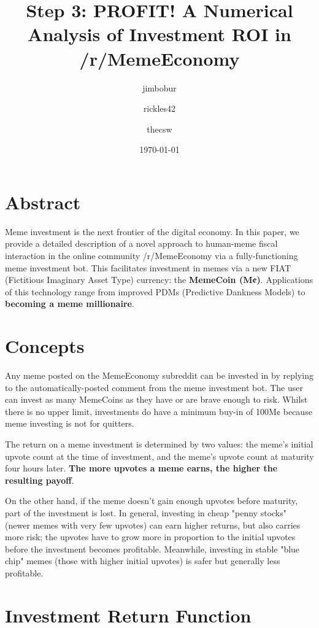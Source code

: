 \documentclass[a4paper, 12pt]{article}
\author[1]{jimbobur}\author[2]{rickles42}\author[2]{thecsw}
\affil[1]{University of Memechester}\affil[2]{Memeachusetts Institute of Dankology}
\date{\today}
\title{Step 3: PROFIT! A Numerical Analysis of Investment ROI in /r/MemeEconomy}
\begin{document}
\maketitle

\section*{Abstract}
\label{sec:orgff17c0a}

Meme investment is the next frontier of the digital economy. In this paper, we
provide a detailed description of a novel approach to human-meme fiscal interaction in the online 
community /r/MemeEconomy \cite{ME_subreddit} via a fully-functioning meme investment bot. This facilitates
investment in memes via a new FIAT (Fictitious Imaginary Asset Type) currency: the \textbf{MemeCoin (M¢)}. 
Applications of this technology range from improved PDMs (Predictive Dankness Models) to 
\textbf{becoming a meme millionaire}.

\section*{Concepts}
\label{sec:org8d643c9}

Any meme posted on the MemeEconomy subreddit can be invested in by replying to the automatically-posted 
comment from the meme investment bot. The user can invest as many MemeCoins as they have or are brave enough
to risk. Whilst there is no upper limit, investments do have a minimum buy-in of
100M¢ because meme investing is not for quitters.

The return on a meme investment is determined by two values: the meme's initial upvote
count at the time of investment, and the meme's upvote count at maturity four hours later. 
\textbf{The more upvotes a meme earns, the higher the resulting payoff}.

On the other hand, if the meme doesn't gain enough upvotes before maturity, part of the investment is lost. 
In general, investing in cheap "penny stocks" (newer memes with very few upvotes) can earn 
higher returns, but also carries more risk; the upvotes have to grow more in proportion to the initial
upvotes before the investment becomes profitable. Meanwhile, investing in stable "blue chip" memes
(those with higher initial upvotes) is safer but generally less profitable.

\section*{Investment Return Function}
\label{sec:orgcbf08fd}
\end{document}

